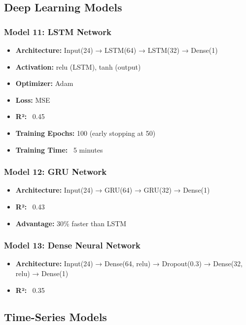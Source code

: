\subsection{Deep Learning Models}

\subsubsection{Model 11: LSTM Network}
\begin{itemize}
    \item \textbf{Architecture:} Input(24) → LSTM(64) → LSTM(32) → Dense(1)
    \item \textbf{Activation:} relu (LSTM), tanh (output)
    \item \textbf{Optimizer:} Adam
    \item \textbf{Loss:} MSE
    \item \textbf{R²:} ~0.45
    \item \textbf{Training Epochs:} 100 (early stopping at 50)
    \item \textbf{Training Time:} ~5 minutes
\end{itemize}

\subsubsection{Model 12: GRU Network}
\begin{itemize}
    \item \textbf{Architecture:} Input(24) → GRU(64) → GRU(32) → Dense(1)
    \item \textbf{R²:} ~0.43
    \item \textbf{Advantage:} 30\% faster than LSTM
\end{itemize}

\subsubsection{Model 13: Dense Neural Network}
\begin{itemize}
    \item \textbf{Architecture:} Input(24) → Dense(64, relu) → Dropout(0.3) → Dense(32, relu) → Dense(1)
    \item \textbf{R²:} ~0.35
\end{itemize}

\subsection{Time-Series Models}

